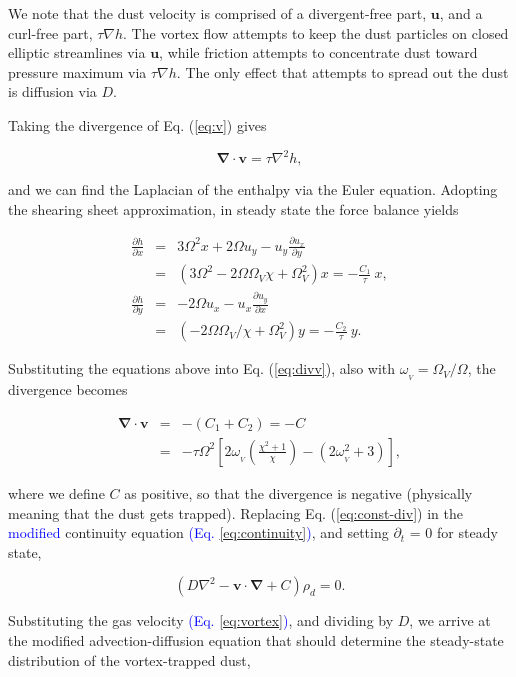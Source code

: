 \documentclass[apj]{emulateapj}
\newcommand{\pderiv}[2]{\frac{\partial #1}{\partial #2}}
\renewcommand{\v}[1]{{\boldsymbol{#1}}} %
\def\blue#1{\textcolor{blue}{#1}}
\newcommand{\del}{\v{\nabla}}
\newcommand{\Div}{\del\cdot}
\newcommand{\Laplace}{\nabla^2}
\newcommand{\Eq}[1]{Eq. (\ref{#1})}
\newcommand{\eq}[1]{\Eq{#1}}
\newcommand{\eqp}[1]{(Eq. \ref{#1})}
\newcommand{\beq}{\begin{equation}}
\newcommand{\eeq}{\end{equation}}
\newcommand{\beqn}{\begin{eqnarray}}
\newcommand{\eeqn}{\end{eqnarray}}
\begin{document}
We note that the dust
velocity is comprised of a divergent-free part, $\v{u}$, and a
curl-free part, $\tau\nabla{h}$. The vortex flow attempts to keep the
dust particles on closed elliptic streamlines via $\v{u}$, while friction
attempts to concentrate dust toward pressure maximum via $\tau\nabla
h$. The only effect that attempts to spread out the dust is diffusion
via $D$.  

Taking the divergence of
\eq{eq:v} gives 

\beq
\Div{\v{v}} = \tau \Laplace{h}, 
\label{eq:divv}
\eeq

\noindent and we can find the Laplacian of the enthalpy via the Euler
equation. Adopting the shearing sheet approximation, in steady state
the force balance yields  

\begin{eqnarray}
\pderiv{h}{x} &=& 3\varOmega^2 x + 2\varOmega u_y -
u_y\pderiv{u_x}{y} \nonumber \\
&=& \left(3\varOmega^2 - 2\varOmega\varOmega_V \chi + \varOmega_V^2\right) x
= -\frac{C_1}{\tau} \  x,  \label{eq:gas_mom1}\\
\pderiv{h}{y} &=& - 2\varOmega u_x -
u_x\pderiv{u_y}{x} \nonumber \\
&=& \left(-2\varOmega\varOmega_V/\chi + \varOmega_V^2\right) y = -\frac{C_2}{\tau} \  y.\label{eq:gas_mom2}
\end{eqnarray}

\noindent  Substituting the equations above into \eq{eq:divv}, also
with $\omega_{_V}=\varOmega_V/\varOmega$, the divergence becomes 

\beqn
\Div{\v{v}} &=& -(C_1+C_2) = - C \label{eq:const-div}\\
&=& - \tau\varOmega^2
\left[2\omega_{_V}\left(\frac{\chi^2+1}{\chi}\right) - (2\omega_{_V}^2
  + 3) \right], 
\label{eq:scale-div}
\eeqn

\noindent where we define $C$ as positive, so that the divergence is
negative (physically meaning that the dust gets trapped). Replacing
\eq{eq:const-div} in the \blue{modified} continuity equation \blue{\eqp{eq:continuity}}, and setting $\partial_t$ =
0 for steady state, 

\beq
\left(D\Laplace{} -  \v{v}\cdot\del  + C\right)\rho_d = 0. 
\label{eq:steady}
\eeq

Substituting the gas velocity \blue{\eqp{eq:vortex}}, and dividing by $D$, we
arrive at the modified advection-diffusion equation that should
determine the steady-state distribution of the vortex-trapped dust, 
\end{document}
